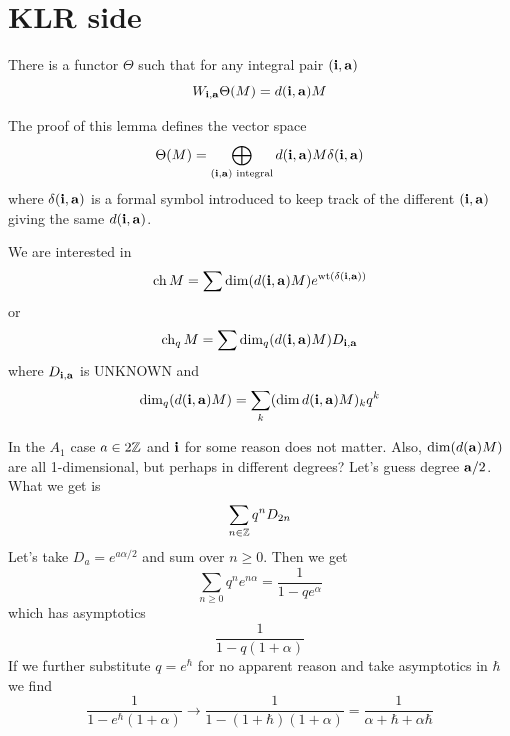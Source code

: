 \documentclass[11pt]{article}
\begin{document}
\section*{KLR side}
\begin{lemma}\cite{kamnitzer2019category}
    There is a functor $\Theta$ such that for any integral pair $(\mathbf{i},\mathbf{a})$
    \[
    W_{\mathbf{i},\mathbf{a}}\Theta(M) = d(\mathbf{i},\mathbf{a}) M    
    \]
\end{lemma}
The proof of this lemma defines the vector space 
\[
\Theta(M) = \bigoplus_{(\mathbf{i},\mathbf{a})\text{ integral}} d(\mathbf{i},\mathbf{a}) M \delta(\mathbf{i},\mathbf{a})
\]
where $\delta(\mathbf{i},\mathbf{a})$ is a formal symbol introduced to keep track of the different $(\mathbf{i},\mathbf{a})$ giving the same $d(\mathbf{i},\mathbf{a})$. 

We are interested in 
\[
\operatorname{ch} M = \sum \dim (d(\mathbf{i},\mathbf{a}) M) e^{\operatorname{wt} (\delta(\mathbf{i},\mathbf{a}) )}    
\]
or 
\[
\operatorname{ch}_q M = \sum\dim_q (d(\mathbf{i},\mathbf{a}) M) D_{\mathbf{i},\mathbf{a}}   
\]
where $D_{\mathbf{i},\mathbf{a}}$ is UNKNOWN and 
$$\dim_q (d(\mathbf{i},\mathbf{a}) M) = \sum_k (\dim d(\mathbf{i},\mathbf{a}) M)_k q^k$$

In the $A_1$ case $a\in 2\mathbb Z$ and $\mathbf{i}$ for some reason does not matter. 
Also, $\dim (d(\mathbf{a}) M)$ are all 1-dimensional, but perhaps in different degrees? Let's guess degree $\mathbf{a}/2$. 
What we get is 
\[
    \sum_{n\in\mathbb Z} q^{n} D_{2n}
\]
Let's take $D_{a} = e^{a\alpha/2}$ and sum over $n\ge 0$. Then we get 
\[
    \sum_{n\ge 0} q^n e^{n\alpha} = \frac 1 {1 - qe^\alpha}
\]
which has asymptotics 
\[
\frac 1 {1 - q(1 + \alpha)}    
\]
If we further substitute $q = e^\hbar$ for no apparent reason and take asymptotics in $\hbar$ we find 
\[
    \frac 1 {1 - e^\hbar (1 + \alpha)}  \to \frac 1 {1 - (1 + \hbar) (1 + \alpha)} = \frac 1 {\alpha + \hbar + \alpha\hbar } 
\]
%
%


%
%


%
\end{document}
